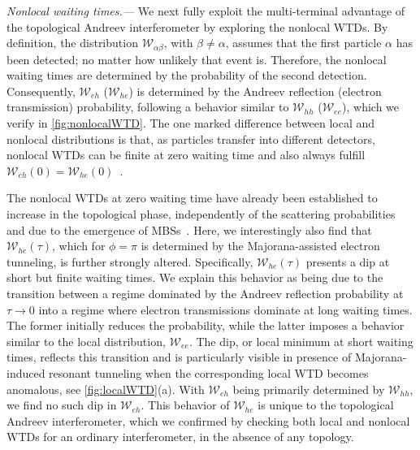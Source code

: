 \documentclass[aps,prl,amsmath,twocolumn,floatfix,superscriptaddress,longbibliography,footinbib]{revtex4-1}
\begin{document}
\textit{Nonlocal waiting times.---} 
We next fully exploit the multi-terminal advantage of the topological Andreev interferometer by exploring the nonlocal WTDs. By definition, the distribution $\mathcal{W}_{\alpha\beta}$, with $\beta\neq\alpha$, assumes that the first particle $\alpha$ has been detected; no matter how unlikely that event is. Therefore, the nonlocal waiting times are determined by the probability of the second detection. Consequently, $\mathcal{W}_{eh}$ ($\mathcal{W}_{he}$) is determined by the Andreev reflection (electron transmission) probability, following a behavior similar to $\mathcal{W}_{hh}$ ($\mathcal{W}_{ee}$), which we verify in \cref{fig:nonlocalWTD}. The one marked difference between local and nonlocal distributions is that, as particles transfer into different detectors, nonlocal WTDs can be finite at zero waiting time and also always fulfill $\mathcal{W}_{eh}(0)=\mathcal{W}_{he}(0)$~\cite{Mi2018}. 

The nonlocal WTDs at zero waiting time have already been established to increase in the topological phase, independently of the scattering probabilities and due to the emergence of MBSs~\cite{Mi2018}. Here, we interestingly also find that $\mathcal{W}_{he}(\tau)$, which for $\phi=\pi$ is determined by the Majorana-assisted electron tunneling, is further strongly altered. Specifically, $\mathcal{W}_{he}(\tau)$ presents a dip at short but finite waiting times. We explain this behavior as being due to the transition between a regime dominated by the Andreev reflection probability at $\tau\rightarrow0$ into a regime where electron transmissions dominate at long waiting times. The former initially reduces the probability, while the latter imposes a behavior similar to the local distribution, $\mathcal{W}_{ee}$. The dip, or local minimum at short waiting times, reflects this transition and is particularly visible in presence of Majorana-induced resonant tunneling when the corresponding local WTD becomes anomalous, see \cref{fig:localWTD}(a). With $\mathcal{W}_{eh}$ being primarily determined by $\mathcal{W}_{hh}$, we find no such dip in $\mathcal{W}_{eh}$. This behavior of $\mathcal{W}_{he}$ is unique to the topological Andreev interferometer, which we confirmed by checking both local and nonlocal WTDs for an ordinary interferometer, in the absence of any topology. 
\end{document}
